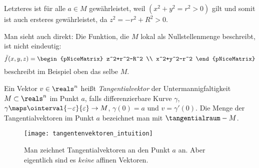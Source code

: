 \begin{beispiele*}
\begin{enumerate}
\begin{beispiel*}
      Letzteres ist für alle \( a\in M \) gewährleistet, weil \( (x^2+y^2=r^2>0) \) gilt und somit ist auch ersteres gewährleistet, da \( z^2=-r^2+R^2>0 \).

      Man sieht auch direkt: Die Funktion, die \( M \) lokal als Nullstellenmenge beschreibt, ist nicht eindeutig: \zb
      \begin{equation*}
        \tilde{f}(x,y,z)=\begin{pNiceMatrix} z^2+r^2-R^2 \\ x^2+y^2-r^2 \end{pNiceMatrix}
      \end{equation*}
      beschreibt im Beispiel oben das selbe \( M \).
    \end{beispiel*}
  \end{enumerate}
\end{beispiele*}
\begin{definition}\label{tangentialraum}
  Ein Vektor \( v\in \reals^n \) heißt \emph{Tangentialvektor} der Untermannigfaltigkeit \( M\subset \reals^n \) im Punkt \( a \), falls \texists differenzierbare Kurve \( \gamma \), \( \gamma\maps \ointerval{-\varepsilon}{\varepsilon} \to M\), \sd \( \gamma(0)=a \) und \( v=\gamma'(0) \). Die Menge der Tangentialvektoren im Punkt \( a \) bezeichnet man mit \( \tangentialraum-{M} \). 
  \begin{figure}[H]
    \centering
    \texttt{[image: tangentenvektoren\_intuition]}
    \caption*{Man zeichnet Tangentialvektoren an den Punkt \( a \) an. Aber eigentlich sind es \emph{keine} affinen Vektoren.}
    \label{fig:tangentenvektoren_intuition}
  \end{figure}
\end{definition}
